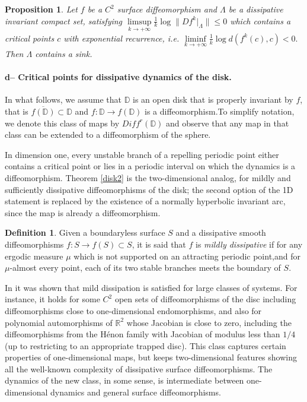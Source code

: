 \documentclass[a4paper,11pt]{article}
\newtheorem{proposition}[lemma]{Proposition}
\theoremstyle{definition}
\newtheorem{definition}[lemma]{Definition}
\def\DD{{\mathbb D}}
\def\RR{{\mathbb R}}
\def\La{\Lambda}
\def\La{\Lambda}
\begin{document}
\begin{proposition}\label{exponential recurrence}
Let $f$ be a $C^2$ surface diffeomorphism and $\La$ be a dissipative invariant compact set,  satisfying $\underset{k\to +\infty}\limsup \tfrac 1 k \log \|Df^k|_\La\|\leq 0$ which contains a critical points $c$
with exponential recurrence, i.e. $\underset{k\to +\infty}\liminf \tfrac 1 k \log d(f^k(c),c)< 0.$
Then $\La$ contains a sink.
\end{proposition}



\paragraph{d-- Critical points for dissipative dynamics of the disk.}





In what follows, we assume that $\DD$ is an open disk that is properly invariant by $f$, that is $\overline{f(\DD)}\subset \DD$ and $f: \DD\to f(\DD)$ is a diffeomorphism.To simplify notation, we denote this class of maps by $ Diff^r(\DD)$ and observe that any map in that class can be extended to a diffeomorphism of the sphere.

In dimension one, every unstable branch of a repelling periodic point either contains a critical point or lies in a periodic interval on which the dynamics is a diffeomorphism. Theorem \ref{disk2} is the two-dimensional analog, for mildly and sufficiently dissipative diffeomorphisms of the disk; the second option of the 1D statement is replaced by the existence of a normally hyperbolic invariant arc, since the map is already a diffeomorphism.


\begin{definition}
      Given a boundaryless surface $S$ and a dissipative  smooth diffeomorphisms $f:S\to f(S)\subset S$,  it is said that $f$ is {\it mildly dissipative} if for any ergodic measure $\mu$ which is not supported on an attracting periodic point,and   for $\mu$-almost every point, each of its  two stable branches   meets the boundary of $S$.
 \end{definition}

In \cite{CP} it was shown
that mild dissipation is satisfied for large classes of systems. For instance, it holds for some $C^2$
open sets of diffeomorphisms of the disc including diffeomorphisms close to one-dimensional endomorphisms, and also for polynomial automorphisms of $\RR^2$ whose
Jacobian is  close to zero, including the diffeomorphisms from the H\'enon family
with Jacobian of modulus less than $1/4$ (up to restricting to an appropriate trapped disc).  This class captures certain properties of one-dimensional maps, but keeps two-dimensional
features showing all the well-known complexity of dissipative surface diffeomorphisms.
The dynamics of the new class, in some sense, is intermediate between one-dimensional
dynamics and general surface diffeomorphisms.
\end{document}
